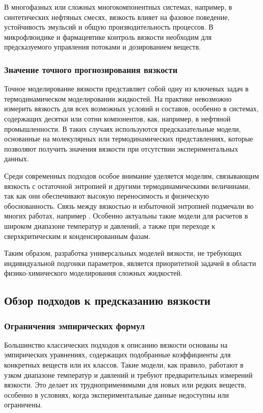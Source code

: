 \documentclass[a4paper,12pt]{article}
\begin{document}
В многофазных или сложных многокомпонентных системах, например, в синтетических нефтяных смесях, вязкость влияет на фазовое поведение, устойчивость эмульсий и общую производительность процессов. В микрофлюидике и фармацевтике контроль вязкости необходим для предсказуемого управления потоками и дозированием веществ.

    \subsubsection{Значение точного прогнозирования вязкости}

Точное моделирование вязкости представляет собой одну из ключевых задач в термодинамическом моделировании жидкостей. На практике невозможно измерить вязкость для всех возможных условий и составов, особенно в системах, содержащих десятки или сотни компонентов, как, например, в нефтяной промышленности. В таких случаях используются предсказательные модели, основанные на молекулярных или термодинамических представлениях, которые позволяют получить значения вязкости при отсутствии экспериментальных данных.

Среди современных подходов особое внимание уделяется моделям, связывающим вязкость с остаточной энтропией и другими термодинамическими величинами, так как они обеспечивают высокую переносимость и физическую обоснованность. Связь между вязкостью и избыточной энтропией подмечали во многих работах, например \cite{taib2020residual}. Особенно актуальны такие модели для расчетов в широком диапазоне температур и давлений, а также при переходе к сверхкритическим и конденсированным фазам.

Таким образом, разработка универсальных моделей вязкости, не требующих индивидуальной подгонки параметров, является приоритетной задачей в области физико-химического моделирования сложных жидкостей.

  \subsection{Обзор подходов к предсказанию вязкости}

    \subsubsection{Ограничения эмпирических формул}
      Большинство классических подходов к описанию вязкости основаны на эмпирических уравнениях, содержащих подобранные коэффициенты для конкретных веществ или их классов. Такие модели, как правило, работают в узком диапазоне температур и давлений и требуют предварительных измерений вязкости. Это делает их трудноприменимыми для новых или редких веществ, особенно в условиях, когда экспериментальные данные недоступны или ограничены. 
\end{document}
